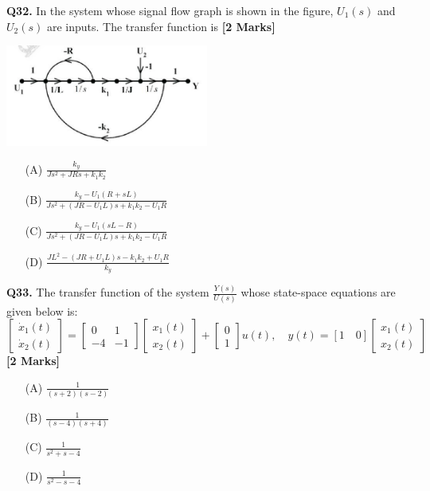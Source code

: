 \documentclass[11pt]{article}
\newcommand{\questionb}[2]{
    \noindent\textbf{Q#2.} #1 \hfill \textbf{[2 Marks]}
}
\begin{document}
\questionb{In the system whose signal flow graph is shown in the figure, \( U_1(s) \) and \( U_2(s) \) are inputs. The transfer function is}{32}
\begin{center}
\includegraphics[width=0.5\textwidth]{figures/32.png}
\end{center}
\begin{enumerate}
    \item[(A)] \( \frac{k_y}{Js^2 + JR s + k_1k_2} \)  
    \item[(B)] \( \frac{k_y - U_1(R + sL)}{Js^2 + (JR - U_1L)s + k_1k_2 - U_1R} \)  
    \item[(C)] \( \frac{k_y - U_1(sL - R)}{Js^2 + (JR - U_1L)s + k_1k_2 - U_1R} \)  
    \item[(D)] \( \frac{JL^2 - (JR + U_1L)s - k_1k_2 + U_1R}{k_y} \)  
\end{enumerate}
\vspace{0.5cm}

\questionb{The transfer function of the system \( \frac{Y(s)}{U(s)} \) whose state-space equations are given below is: \\
\[
\begin{bmatrix}
\dot{x}_1(t) \\ \dot{x}_2(t)
\end{bmatrix}
=
\begin{bmatrix}
0 & 1 \\
-4 & -1
\end{bmatrix}
\begin{bmatrix}
x_1(t) \\ x_2(t)
\end{bmatrix}
+
\begin{bmatrix}
0 \\ 1
\end{bmatrix} u(t), \quad
y(t) = [1 \quad 0] \begin{bmatrix}
x_1(t) \\ x_2(t)
\end{bmatrix}
\]}{33}
\begin{enumerate}
    \item[(A)] \( \frac{1}{(s+2)(s-2)} \)  
    \item[(B)] \( \frac{1}{(s-4)(s+4)} \)  
    \item[(C)] \( \frac{1}{s^2 + s - 4} \)  
    \item[(D)] \( \frac{1}{s^2 - s - 4} \)  
\end{enumerate}
\vspace{0.5cm}
\end{document}
